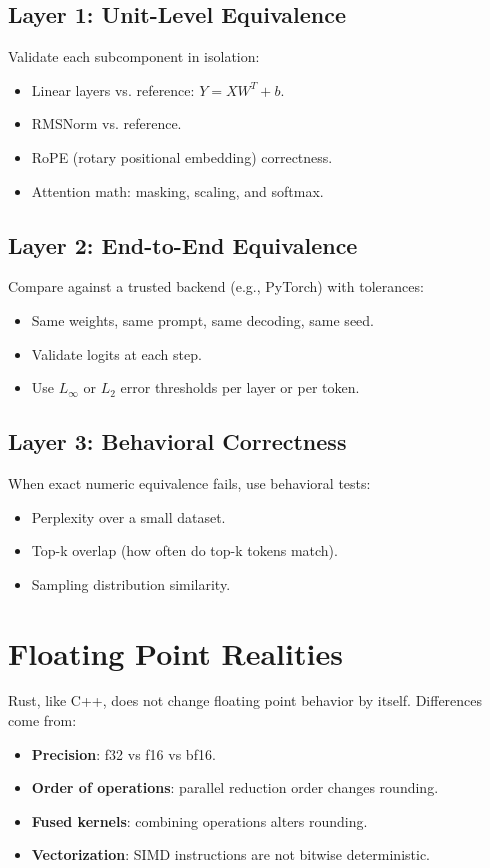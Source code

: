 \documentclass[11pt]{article}
\begin{document}
\subsection{Layer 1: Unit-Level Equivalence}
Validate each subcomponent in isolation:
\begin{itemize}
  \item Linear layers vs. reference: $Y = XW^T + b$.
  \item RMSNorm vs. reference.
  \item RoPE (rotary positional embedding) correctness.
  \item Attention math: masking, scaling, and softmax.
\end{itemize}

\subsection{Layer 2: End-to-End Equivalence}
Compare against a trusted backend (e.g., PyTorch) with tolerances:
\begin{itemize}
  \item Same weights, same prompt, same decoding, same seed.
  \item Validate logits at each step.
  \item Use $L_\infty$ or $L_2$ error thresholds per layer or per token.
\end{itemize}

\subsection{Layer 3: Behavioral Correctness}
When exact numeric equivalence fails, use behavioral tests:
\begin{itemize}
  \item Perplexity over a small dataset.
  \item Top-k overlap (how often do top-k tokens match).
  \item Sampling distribution similarity.
\end{itemize}

\section{Floating Point Realities}
Rust, like C++, does not change floating point behavior by itself. Differences come from:
\begin{itemize}
  \item \textbf{Precision}: f32 vs f16 vs bf16.
  \item \textbf{Order of operations}: parallel reduction order changes rounding.
  \item \textbf{Fused kernels}: combining operations alters rounding.
  \item \textbf{Vectorization}: SIMD instructions are not bitwise deterministic.
\end{itemize}
\end{document}
